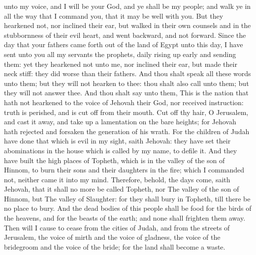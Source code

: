 unto my voice, and I will be your God, and ye shall be my people; and walk ye in all the way that I command you, that it may be well with you. But they hearkened not, nor inclined their ear, but walked in their own counsels and in the stubbornness of their evil heart, and went backward, and not forward. Since the day that your fathers came forth out of the land of Egypt unto this day, I have sent unto you all my servants the prophets, daily rising up early and sending them: yet they hearkened not unto me, nor inclined their ear, but made their neck stiff: they did worse than their fathers.  And thou shalt speak all these words unto them; but they will not hearken to thee: thou shalt also call unto them; but they will not answer thee. And thou shalt say unto them, This is the nation that hath not hearkened to the voice of Jehovah their God, nor received instruction: truth is perished, and is cut off from their mouth.  Cut off thy hair, O Jerusalem, and cast it away, and take up a lamentation on the bare heights; for Jehovah hath rejected and forsaken the generation of his wrath. For the children of Judah have done that which is evil in my sight, saith Jehovah: they have set their abominations in the house which is called by my name, to defile it. And they have built the high places of Topheth, which is in the valley of the son of Hinnom, to burn their sons and their daughters in the fire; which I commanded not, neither came it into my mind. Therefore, behold, the days come, saith Jehovah, that it shall no more be called Topheth, nor The valley of the son of Hinnom, but The valley of Slaughter: for they shall bury in Topheth, till there be no place to bury. And the dead bodies of this people shall be food for the birds of the heavens, and for the beasts of the earth; and none shall frighten them away. Then will I cause to cease from the cities of Judah, and from the streets of Jerusalem, the voice of mirth and the voice of gladness, the voice of the bridegroom and the voice of the bride; for the land shall become a waste. 

